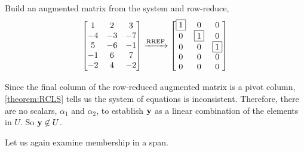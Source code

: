 \documentclass{ximera}
\begin{document}
\begin{example}
  Build an augmented matrix from the system and row-reduce,
  \[
    \begin{bmatrix}
      1 & 2 & 3\\
      -4 & -3 & -7\\
      5 & -6 & -1\\
      -1 & 6 & 7\\
      -2 & 4 & -2
    \end{bmatrix}
    \xrightarrow{\text{RREF}}
    \begin{bmatrix}
      \fbox{1} & 0 & 0\\
      0 & \fbox{1} & 0\\
      0 & 0 & \fbox{1}\\
      0 & 0 & 0\\
      0 & 0 & 0
    \end{bmatrix}
  \]

  Since the final column of the row-reduced augmented matrix is a
  pivot column, \ref{theorem:RCLS} tells us the system of equations is
  inconsistent.  Therefore, there are no scalars, $\alpha_1$ and
  $\alpha_2$, to establish $\mathbf{y}$ as a linear combination of the
  elements in $U$.  So $\mathbf{y}\not\in U$.
\end{example}

Let us again examine membership in a span.
\end{document}
